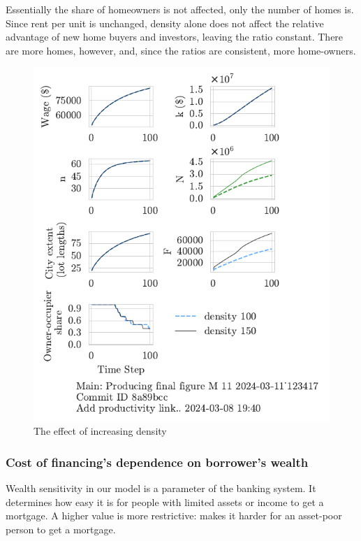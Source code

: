 Essentially the share of homeowners is not affected, only the number of homes is. Since rent per unit is unchanged, density alone does not affect the relative advantage of new home buyers and investors, leaving the ratio constant. There are more homes, however, and, since the ratios are consistent, more home-owners. 

\begin{figure}[h!bt]
    \centering
    \includegraphics[scale=.8, trim={0 1.4cm 0 0},clip]{fig/density-Main-123417.pdf}
    \caption{The effect of increasing density}
    \label{fig:density_ownership_trajectory}
\end{figure}


\newpage

\subsubsection{Cost of financing's dependence on borrower's wealth}
Wealth sensitivity in our model is a parameter of the banking system. It determines how easy it is for people with limited assets or income to get a mortgage. A higher value is more restrictive:  makes it harder for an asset-poor person to get a mortgage.

